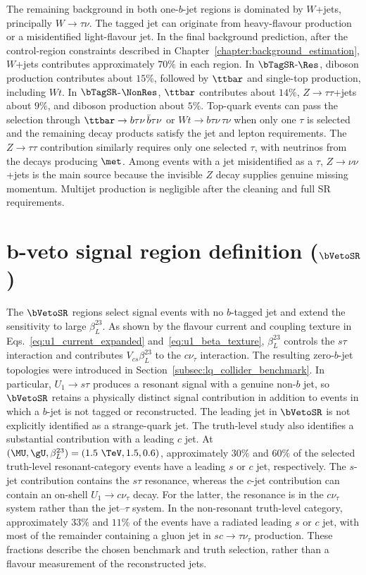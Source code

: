 The remaining background in both one-$b$-jet regions is dominated by $W$+jets, principally $W\to\tau\nu$.
The tagged jet can originate from heavy-flavour production or a misidentified light-flavour jet.
In the final background prediction, after the control-region constraints described in Chapter~\ref{chapter:background_estimation}, $W$+jets contributes approximately $70\%$ in each region.
In $\bTagSR$-$\Res$, diboson production contributes about $15\%$, followed by $\ttbar$ and single-top production, including $Wt$.
In $\bTagSR$-$\NonRes$, $\ttbar$ contributes about $14\%$, $Z\to\tau\tau$+jets about $9\%$, and diboson production about $5\%$.
Top-quark events can pass the selection through $\ttbar\to b\tau\nu\,\bar b\tau\nu$ or $Wt\to b\tau\nu\,\tau\nu$ when only one $\tau$ is selected and the remaining decay products satisfy the jet and lepton requirements.
The $Z\to\tau\tau$ contribution similarly requires only one selected $\tau$, with neutrinos from the decays producing $\met$.
Among events with a jet misidentified as a $\tau$, $Z\to\nu\nu$+jets is the main source because the invisible $Z$ decay supplies genuine missing momentum.
Multijet production is negligible after the cleaning and full SR requirements.

\clearpage
\section[b-veto signal region definition (SR0b)]{b-veto signal region definition ($\bVetoSR$)}
\label{sec:ch7_sr0b}

The $\bVetoSR$ regions select signal events with no $b$-tagged jet and extend the sensitivity to large $\beta_L^{23}$.
As shown by the flavour current and coupling texture in Eqs.~\ref{eq:u1_current_expanded} and~\ref{eq:u1_beta_texture}, $\beta_L^{23}$ controls the $s\tau$ interaction and contributes $V_{cs}\beta_L^{23}$ to the $c\nu_\tau$ interaction.
The resulting zero-$b$-jet topologies were introduced in Section~\ref{subsec:lq_collider_benchmark}.
In particular, $U_1\to s\tau$ produces a resonant signal with a genuine non-$b$ jet, so $\bVetoSR$ retains a physically distinct signal contribution in addition to events in which a $b$-jet is not tagged or reconstructed.
The leading jet in $\bVetoSR$ is not explicitly identified as a strange-quark jet.
The truth-level study also identifies a substantial contribution with a leading $c$ jet.
At $(\MU,\gU,\beta_L^{23})=(1.5~\TeV,1.5,0.6)$, approximately $30\%$ and $60\%$ of the selected truth-level resonant-category events have a leading $s$ or $c$ jet, respectively.
The $s$-jet contribution contains the $s\tau$ resonance, whereas the $c$-jet contribution can contain an on-shell $U_1\to c\nu_\tau$ decay.
For the latter, the resonance is in the $c\nu_\tau$ system rather than the jet--$\tau$ system.
In the non-resonant truth-level category, approximately $33\%$ and $11\%$ of the events have a radiated leading $s$ or $c$ jet, with most of the remainder containing a gluon jet in $sc\to\tau\nu_\tau$ production.
These fractions describe the chosen benchmark and truth selection, rather than a flavour measurement of the reconstructed jets.

